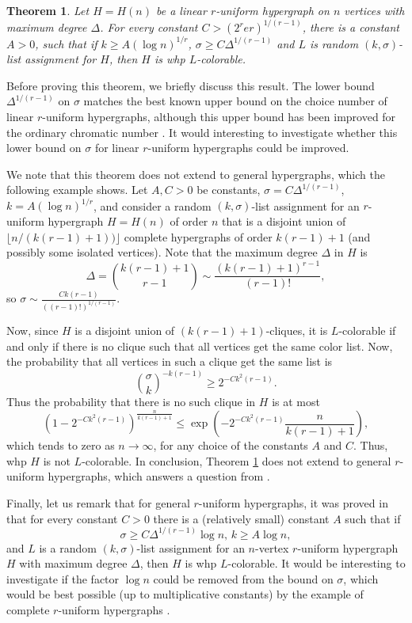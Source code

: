\documentclass[12pt]{article}
\newtheorem{theorem}{Theorem}[section]
\newcommand{\1}{\mathds{1}}
\begin{document}
\begin{theorem}
\label{th:main}
	Let $H =H(n)$ be a linear $r$-uniform hypergraph on $n$ vertices with maximum degree 
	$\Delta$.
	For every constant $C >  (2^r er)^{1/(r-1)}$, there is a constant $A >0$, such that if 
	$k \geq A (\log n)^{1/r}$, $\sigma \geq C \Delta^{1/(r-1)}$ and
	$L$ is random 
	$(k, \sigma)$-list assignment for $H$, 
	then $H$ is whp $L$-colorable.
\end{theorem}
	
	Before proving this theorem, we briefly discuss this result.
	The lower bound $\Delta^{1/(r-1)}$ on $\sigma$ 
	matches the best known upper bound on the choice number
	of linear $r$-uniform hypergraphs, although this upper bound has been improved for the 
	ordinary chromatic
	number \cite{FriezeMubayi}. 
	It would interesting to investigate whether this lower bound on $\sigma$ for linear 
	$r$-uniform hypergraphs could be improved.

	We note that this theorem does not extend to general hypergraphs, 
	which the following example shows.
	Let  $A,C > 0$ be constants, $\sigma = C \Delta^{1/(r-1)}$, 
	$k = A (\log n)^{1/r}$, and consider a 
	random $(k,\sigma)$-list assignment for an $r$-uniform hypergraph $H=H(n)$ of order $n$ that 
	is a disjoint union of $\lfloor n/(k(r-1)+1)) \rfloor$ complete hypergraphs of order $k(r-1)+1$
	(and possibly some isolated vertices). 
	Note that the maximum degree $\Delta$ in $H$ is 
	$$\Delta= \binom{k(r-1)+1}{r-1} \sim \frac{(k(r-1)+1)^{r-1}}{(r-1)!},$$
	so $\sigma \sim \frac{C k(r-1)}{((r-1)!)^{1/(r-1)}}$.

Now, since $H$ is a disjoint union of $(k(r-1)+1)$-cliques, it is $L$-colorable if and only if
there is no clique such that all vertices get the same color list. 
Now, the probability that
all vertices in such a clique get the same list is 
$$\binom{\sigma}{k}^{-k(r-1)} \geq 2^{-Ck^2(r-1)}.$$
Thus the probability that there is no such clique in $H$ is at most 
$$
\left(1-2^{-Ck^2(r-1)}\right)^{\frac{n}{k(r-1)+1}}
\leq
\exp\left(-2^{-Ck^2(r-1)}\frac{n}{k(r-1)+1} \right),
$$
which tends to zero as $n \to \infty$, for any choice of the constants $A$ and $C$. 
Thus, whp $H$ is not $L$-colorable. In conclusion, Theorem \ref{th:main} does not extend to general
$r$-uniform hypergraphs, which answers a question from \cite{Casselgren5}.

	Finally, let us remark that for general $r$-uniform hypergraphs, it was proved in \cite{Casselgren5}
	that for every constant $C>0$ there is a (relatively small) 
	constant $A$ such that if $$\sigma \geq C \Delta^{1/(r-1)} \log n, \,
	k \geq A \log n,$$ and $L$ is a random $(k,\sigma)$-list assignment for an $n$-vertex $r$-uniform 
	hypergraph $H$ with maximum degree $\Delta$, then $H$ is whp $L$-colorable. 
	It would be interesting to investigate if the factor $\log n$
	could be removed from the bound on $\sigma$, which would be best possible (up to multiplicative constants) 
	by the example of complete $r$-uniform
	hypergraphs \cite{Casselgren5}.
\end{document}
